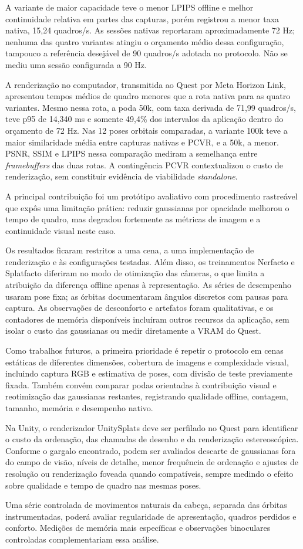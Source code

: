 A variante de maior capacidade teve o menor LPIPS offline e melhor continuidade relativa em partes das capturas, porém registrou a menor taxa nativa, 15,24 quadros/s. As sessões nativas reportaram aproximadamente 72 Hz; nenhuma das quatro variantes atingiu o orçamento médio dessa configuração, tampouco a referência desejável de 90 quadros/s adotada no protocolo. Não se mediu uma sessão configurada a 90 Hz.

\newpage

A renderização no computador, transmitida ao Quest por Meta Horizon Link, apresentou tempos médios de quadro menores que a rota nativa para as quatro variantes. Mesmo nessa rota, a poda 50k, com taxa derivada de 71,99 quadros/s, teve p95 de 14,340 ms e somente 49,4\% dos intervalos da aplicação dentro do orçamento de 72 Hz. Nas 12 poses orbitais comparadas, a variante 100k teve a maior similaridade média entre capturas nativas e PCVR, e a 50k, a menor. PSNR, SSIM e LPIPS nessa comparação mediram a semelhança entre \textit{framebuffers} das duas rotas. A contingência PCVR contextualizou o custo de renderização, sem constituir evidência de viabilidade \textit{standalone}.

A principal contribuição foi um protótipo avaliativo com procedimento rastreável que expôs uma limitação prática: reduzir gaussianas por opacidade melhorou o tempo de quadro, mas degradou fortemente as métricas de imagem e a continuidade visual neste caso. 

Os resultados ficaram restritos a uma cena, a uma implementação de renderização e às configurações testadas. Além disso, os treinamentos Nerfacto e Splatfacto diferiram no modo de otimização das câmeras, o que limita a atribuição da diferença offline apenas à representação. As séries de desempenho usaram pose fixa; as órbitas documentaram ângulos discretos com pausas para captura. As observações de desconforto e artefatos foram qualitativas, e os contadores de memória disponíveis incluíram outros recursos da aplicação, sem isolar o custo das gaussianas ou medir diretamente a VRAM do Quest.

Como trabalhos futuros, a primeira prioridade é repetir o protocolo em cenas estáticas de diferentes dimensões, cobertura de imagens e complexidade visual, incluindo captura RGB e estimativa de poses, com divisão de teste previamente fixada. Também convém comparar podas orientadas à contribuição visual e reotimização das gaussianas restantes, registrando qualidade offline, contagem, tamanho, memória e desempenho nativo. 

Na Unity, o renderizador UnitySplats deve ser perfilado no Quest para identificar o custo da ordenação, das chamadas de desenho e da renderização estereoscópica. Conforme o gargalo encontrado, podem ser avaliados descarte de gaussianas fora do campo de visão, níveis de detalhe, menor frequência de ordenação e ajustes de resolução ou renderização foveada quando compatíveis, sempre medindo o efeito sobre qualidade e tempo de quadro nas mesmas poses. 

Uma série controlada de movimentos naturais da cabeça, separada das órbitas instrumentadas, poderá avaliar regularidade de apresentação, quadros perdidos e conforto. Medições de memória mais específicas e observações binoculares controladas complementariam essa análise.
